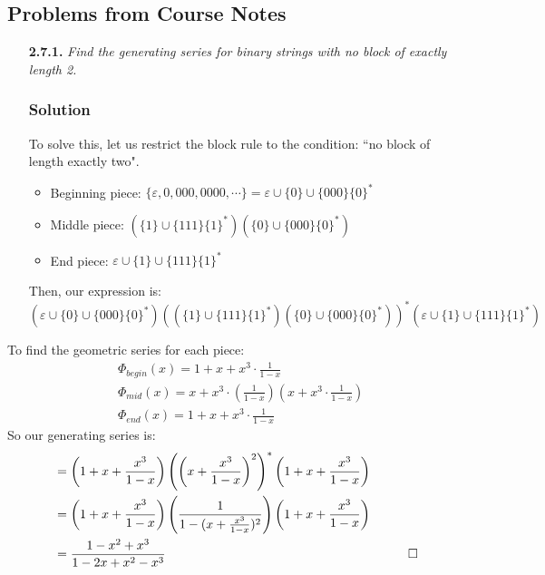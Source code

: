 \documentclass{report}
\begin{document}
\subsection{Problems from Course Notes}
\begin{enumerate}
\item[\textbf{2.7.1.}] \textit{Find the generating series for binary strings with no block of exactly length 2.}
\subsubsection{Solution}
To solve this, let us restrict the block rule to the condition: 	``no block of length exactly two".
\begin{itemize}
\item Beginning piece: $\{\varepsilon, 0, 000, 0000, \cdots\} = \varepsilon \cup \{0\} \cup \{000\}\{0\}^*$
\item Middle piece: $(\{1\} \cup \{111\}\{1\}^*)(\{0\} \cup \{000\}\{0\}^*)$
\item End piece: $\varepsilon \cup \{1\} \cup \{111\}\{1\}^*$
\end{itemize}
Then, our expression is:
$$(\varepsilon \cup \{0\} \cup \{000\}\{0\}^*){((\{1\} \cup \{111\}\{1\}^*)(\{0\} \cup \{000\}\{0\}^*))}^*(\varepsilon \cup \{1\} \cup \{111\}\{1\}^*)$$
\end{enumerate}
To find the geometric series for each piece:
\begin{align*}
&\Phi_{begin}(x) = 1 + x + x^3\cdot \frac{1}{1-x} \\
&\Phi_{mid}(x) = x + x^3\cdot \left(\frac{1}{1-x}\right)\left(x + x^3\cdot \frac{1}{1-x}\right) \\
&\Phi_{end}(x) = 1 + x + x^3 \cdot \frac{1}{1-x}
\end{align*}
So our generating series is:
\begin{align*}
&= \left(1+x+\frac{x^3}{1-x}\right){\left({\left(x+\frac{x^3}{1-x}\right)}^2\right)}^*\left(1 + x + \frac{x^3}{1-x}\right) \\
&= \left(1+x+\frac{x^3}{1-x}\right)\left(\frac{1}{1-(x+\frac{x^3}{1-x})^2}\right)\left(1 + x + \frac{x^3}{1-x}\right)\\
&= \frac{1-x^2+x^3}{1-2x+x^2-x^3} & \qed
\end{align*}
\end{document}
